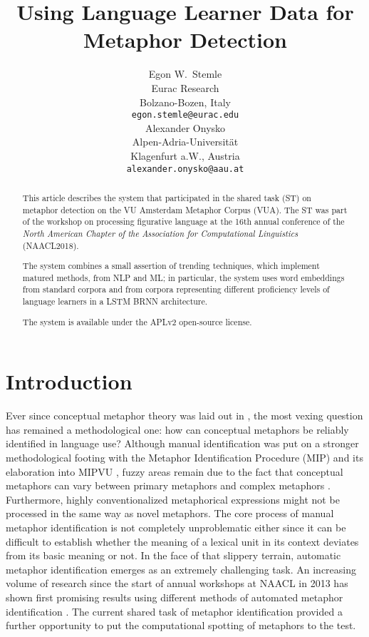 \documentclass[11pt,a4paper]{article}
\title{Using Language Learner Data for Metaphor Detection}
\author{Egon W.~Stemle \\
  Eurac Research \\ 
  Bolzano-Bozen, Italy \\
  {\tt egon.stemle@eurac.edu} \\\And
  Alexander Onysko \\
  Alpen-Adria-Universität \\
  Klagenfurt a.W., Austria \\
  {\tt alexander.onysko@aau.at} \\}
\date{}
\begin{document}
\maketitle
\begin{abstract}
This article describes the system that participated in the shared task (ST) on metaphor detection \cite{Leong2018ATask} on the VU Amsterdam Metaphor Corpus (VUA).
The ST was part of the workshop on processing figurative language at the 16th annual conference of the \emph{North American Chapter of the Association for Computational Linguistics} (NAACL2018).

The system combines a small assertion of trending techniques, which implement matured methods, from NLP and ML; 
in particular, the system uses word embeddings from standard corpora and from corpora representing different proficiency levels of language learners in a LSTM BRNN architecture.

The system is available under the APLv2 open-source license.
\end{abstract}


\section{Introduction} %
\label{sec:intro}
 
Ever since conceptual metaphor theory was laid out in , the most vexing question has remained a methodological one: how can conceptual metaphors be reliably identified in language use? Although manual identification was put on a stronger methodological footing with the Metaphor Identification Procedure (MIP) \cite{doi:10.1080/10926480709336752} and its elaboration into MIPVU \cite{Steen2010}, fuzzy areas remain due to the fact that conceptual metaphors can vary between primary metaphors and complex metaphors \cite[cf.][]{Grady1997}. 
Furthermore, highly conventionalized metaphorical expressions might not be processed in the same way as novel metaphors. The core process of manual metaphor identification is not completely unproblematic either since it can be difficult to establish whether the meaning of a lexical unit in its context deviates from its basic meaning or not. 
In the face of that slippery terrain, automatic metaphor identification emerges as an extremely challenging task. 
An increasing volume of research since the start of annual workshops at NAACL in 2013 has shown first promising results using different methods of automated metaphor identification \cite[cf.][]{W13-0900,W14-2300,W15-1400,W16-1100}.
The current shared task of metaphor identification provided a further opportunity to put the computational spotting of metaphors to the test.
\end{document}
